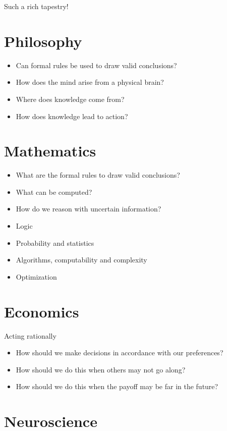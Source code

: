 \documentclass[11pt]{article}
\begin{document}
Such a rich tapestry!
\section{Philosophy}
\label{sec:org313a2d2}

\begin{itemize}
\item Can formal rules be used to draw valid conclusions?
\item How does the mind arise from a physical brain?
\item Where does knowledge come from?
\item How does knowledge lead to action?
\end{itemize}
\section{Mathematics}
\label{sec:org8860eba}

\begin{itemize}
\item What are the formal rules to draw valid conclusions?
\item What can be computed?
\item How do we reason with uncertain information?

\item Logic
\item Probability and statistics
\item Algorithms, computability and complexity
\item Optimization
\end{itemize}
\section{Economics}
\label{sec:orge3f43bc}

Acting rationally

\begin{itemize}
\item How should we make decisions in accordance with our preferences?
\item How should we do this when others may not go along?
\item How should we do this when the payoff may be far in the future?
\end{itemize}
\section{Neuroscience}
\label{sec:org24f8f1b}
\end{document}
